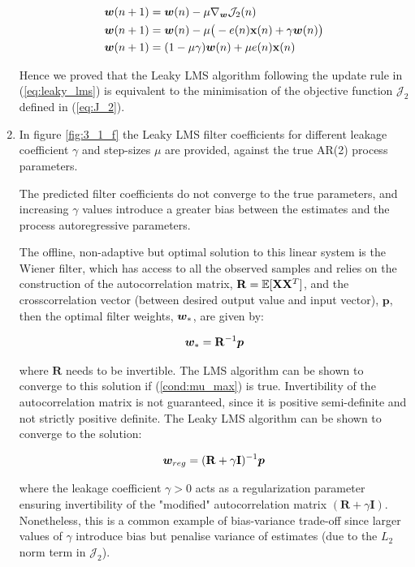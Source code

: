 \begin{enumerate}[label=\alph*), leftmargin=*]
\begin{align}
    {\bm{w}}(n + 1)  &= {\bm{w}}(n) - \mu \nabla_{{\bm{w}}} \mathcal{J}_{2}(n) \\
    {\bm{w}}(n + 1)  &= {\bm{w}}(n) - \mu \big( - e(n) \mathbf{x}(n) + \gamma {\bm{w}}(n) \big) \\
    {\bm{w}}(n + 1)  &= (1 - \mu \gamma) {\bm{w}}(n) + \mu e(n) \mathbf{x}(n)
\label{eq:leaky_lms}
\end{align}

Hence we proved that the Leaky LMS algorithm following the update rule in (\ref{eq:leaky_lms}) is equivalent to the minimisation of the objective function $\mathcal{J}_{2}$
defined in (\ref{eq:J_2}).

\item
%

In figure \ref{fig:3_1_f} the Leaky LMS filter coefficients for different leakage coefficient $\gamma$ and step-sizes $\mu$
are provided, against the true AR(2) process parameters.

The predicted filter coefficients do not converge to the true parameters, and increasing $\gamma$ values introduce
a greater bias between the estimates and the process autoregressive parameters.

The offline, non-adaptive but optimal solution to this linear system is the Wiener filter, which has access to all the
observed samples and relies on the construction of the autocorrelation matrix, $\mathbf{R} = {\mathbb{E}} [ \mathbf{X} \mathbf{X}^{T} ]$,
and the crosscorrelation vector (between desired output value and input vector), $\mathbf{p}$, then the optimal filter weights,
${\bm{w}}_{*}$, are given by:

\begin{equation}
    {\bm{w}}_{*} = \mathbf{R}^{-1} {\bm{p}}
\end{equation}

where $\mathbf{R}$ needs to be invertible. The LMS algorithm can be shown to converge to this solution if (\ref{cond:mu_max})
is true. Invertibility of the autocorrelation matrix is not guaranteed, since it is positive semi-definite and not strictly
positive definite. The Leaky LMS algorithm can be shown to converge to the solution:

\begin{equation}
    {\bm{w}}_{reg} = (\mathbf{R} + \gamma \mathbf{I})^{-1} {\bm{p}}
\end{equation}

where the leakage coefficient $\gamma > 0$ acts as a regularization parameter ensuring invertibility of the "modified"
autocorrelation matrix $(\mathbf{R} + \gamma \mathbf{I})$. Nonetheless, this is a common example of bias-variance trade-off
since larger values of $\gamma$ introduce bias but penalise variance of estimates
(due to the $L_{2}$ norm term in $\mathcal{J}_{2}$).


\end{enumerate}
